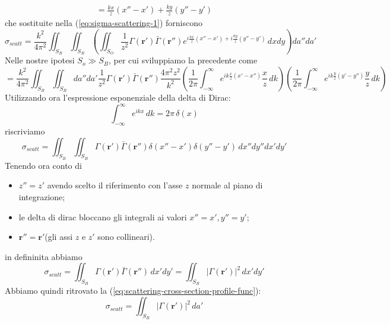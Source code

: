 \begin{fullwidth}
\begin{gather*}
    = \frac{kx}{z}(x''-x') +\frac{ky}{z}(y''-y')
    \end{gather*}
    che sostituite nella (\ref{eq:sigma-scattering-1}) forniscono
    \[
    \sigma_{scatt} = \frac{k^{2}}{4 \pi^{2}} \iint_{S_{B}}\iint_{S_{B}} \left( \iint_{S_{O}} \frac{1}{z^{2}} \Gamma(\bm{r}')\bar{\Gamma}(\bm{r}'') e^{ i \frac{kx}{z}(x''-x') + i \frac{ky}{z} (y'' - y')} \, dxdy\right) da''da'
    \]
    Nelle nostre ipotesi $S_{o} \gg S_{B}$, per cui sviluppiamo la precedente come
    \[
     = \frac{k^{2}}{4 \pi^{2}} \iint_{S_{B}}\iint_{S_{B}} da'' da'\frac{1}{z^{2}} \Gamma(\bm{r}') \bar{\Gamma}(\bm{r}'') \frac{4 \pi^{2}z^{2}}{k^{2}}\left( \frac{1}{2 \pi} \int_{-\infty}^{\infty} e^{ ik \frac{x}{z}(x'-x'') } \frac{x}{z} \, dk  \right)\left( \frac{1}{2 \pi} \int_{-\infty}^{\infty} e^{ ik \frac{y}{z}(y'-y'') } \frac{y}{z} \, dk  \right)
    \]
    Utilizzando ora l'espressione esponenziale della delta di Dirac:
    \[
    \int_{-\infty}^{\infty} e^{ ikx } \, dk = 2 \pi \, \delta(x)
    \]
    riscriviamo
    \[
    \sigma_{scatt} = \iint_{S_{B}}\iint_{S_{B}} \Gamma(\bm{r}') \bar{\Gamma}(\bm{r}'') \delta(x''-x')\delta(y''-y') \,dx''dy''dx'dy'
    \]
    Tenendo ora conto di
    \begin{itemize}
        \item $z'' = z'$ avendo scelto il riferimento con l'asse $z$ normale al piano di integrazione;
        \item le delta di dirac bloccano gli integrali ai valori $x''=x',y''=y'$;
        \item $\bm{r}''=\bm{r}'$(gli assi $z$ e $z'$ sono collineari). %
    \end{itemize}
    in defininita abbiamo
    \[
    \sigma_{scatt} = \iint_{S_{B}}  \Gamma(\bm{r}') \bar{\Gamma}(\bm{r}'') \, dx'dy'= \iint_{S_{B}} |\Gamma(\bm{r}')|^{2} \, dx'dy'
    \]
    Abbiamo quindi ritrovato la (\ref{eq:scattering-cross-section-profile-func}):
    \[
    \sigma_{scatt} = \iint_{S_{B}}  |\Gamma(\bm{r}')|^{2} \, da'
    \]
\end{fullwidth}

